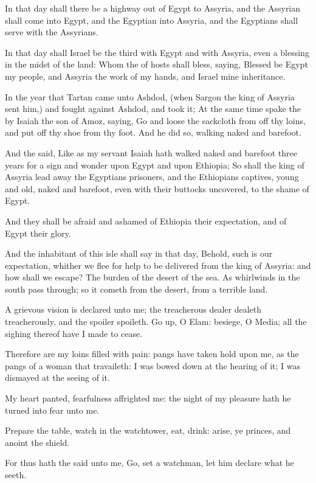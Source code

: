 \Verse In that day shall there be a highway out of Egypt to Assyria, and the Assyrian shall come into Egypt, and the Egyptian into Assyria, and the Egyptians shall serve with the Assyrians.

\Verse In that day shall Israel be the third with Egypt and with Assyria, even a blessing in the midst of the land: \Verse Whom the \LORD of hosts shall bless, saying, Blessed be Egypt my people, and Assyria the work of my hands, and Israel mine inheritance.


\Chapter
\Verse In the year that Tartan came unto Ashdod, (when Sargon the king of Assyria sent him,) and fought against Ashdod, and took it; \Verse At the same time spake the \LORD by Isaiah the son of Amoz, saying, Go and loose the sackcloth from off thy loins, and put off thy shoe from thy foot. And he did so, walking naked and barefoot.

\Verse And the \LORD said, Like as my servant Isaiah hath walked naked and barefoot three years for a sign and wonder upon Egypt and upon Ethiopia; \Verse So shall the king of Assyria lead away the Egyptians prisoners, and the Ethiopians captives, young and old, naked and barefoot, even with their buttocks uncovered, to the shame of Egypt.

\Verse And they shall be afraid and ashamed of Ethiopia their expectation, and of Egypt their glory.

\Verse And the inhabitant of this isle shall say in that day, Behold, such is our expectation, whither we flee for help to be delivered from the king of Assyria: and how shall we escape?  
\Chapter
\Verse The burden of the desert of the sea. As whirlwinds in the south pass through; so it cometh from the desert, from a terrible land.

\Verse A grievous vision is declared unto me; the treacherous dealer dealeth treacherously, and the spoiler spoileth. Go up, O Elam: besiege, O Media; all the sighing thereof have I made to cease.

\Verse Therefore are my loins filled with pain: pangs have taken hold upon me, as the pangs of a woman that travaileth: I was bowed down at the hearing of it; I was dismayed at the seeing of it.

\Verse My heart panted, fearfulness affrighted me: the night of my pleasure hath he turned into fear unto me.

\Verse Prepare the table, watch in the watchtower, eat, drink: arise, ye princes, and anoint the shield.

\Verse For thus hath the \LORD said unto me, Go, set a watchman, let him declare what he seeth.

